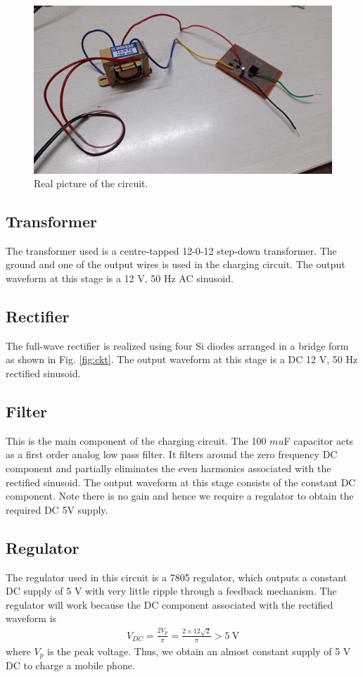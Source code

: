 \documentclass[journal,12pt,twocolumn]{IEEEtran}
\begin{document}
\begin{figure}[!htb]
    \includegraphics[width=\columnwidth]{figs/Real_pic.jpg}
    \caption{Real picture of the circuit.}
    \label{fig:hardware}
\end{figure}
\subsection{Transformer}
The transformer used is a centre-tapped 12-0-12 step-down 
transformer. The ground and one of the output wires is used
in the charging circuit. The output waveform at this stage is
a 12 V, 50 Hz AC sinusoid.

\subsection{Rectifier}
The full-wave rectifier is realized using four Si diodes arranged in a
bridge form as shown in Fig. \ref{fig:ckt}. The output waveform at this
stage is a DC 12 V, 50 Hz rectified sinusoid.

\subsection{Filter}
This is the main component of the charging circuit. The 100 $mu$F
capacitor acts as a first order analog low pass filter. It filters
around the zero frequency DC component and partially eliminates the
even harmonics associated with the rectified sinusoid. The output 
waveform at this stage consists of the constant DC component. Note
there is no gain and hence we require a regulator to obtain the
required DC 5V supply.

\subsection{Regulator}
The regulator used in this circuit is a 7805 regulator, which outputs
a constant DC supply of 5 V with very little ripple through a 
feedback mechanism. The regulator will work because the DC component 
associated with the rectified waveform is
\begin{align}
    V_{DC} = \frac{2V_p}{\pi} = \frac{2\times12\sqrt{2}}{\pi} > \SI{5}{\V}
\end{align}
where $V_p$ is the peak voltage. Thus, we obtain an almost
constant supply of 5 V DC to charge a mobile phone.
\end{document}
